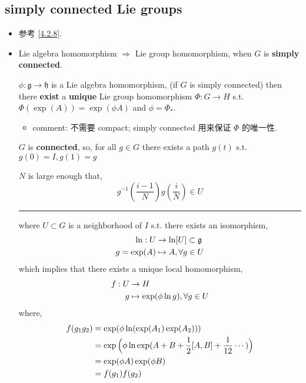\subsection{simply connected Lie groups} \label{subsection 5.1.1}
\begin{itemize}
	\item 参考 \eqref{4.2.8}.
	
	\item Lie algebra homomorphism $\Longrightarrow$ Lie group homomorphism, when $G$ is \textbf{simply connected}.
	
	$\phi : \mathfrak{g} \rightarrow \mathfrak{h}$ is a Lie algebra homomorphism, (if $G$ is simply connected) then there \textbf{exist} a \textbf{unique} Lie group homomorphism $\Phi : G \rightarrow H$ s.t. $\Phi(\exp(A)) = \exp(\phi A)$ and $\phi = \Phi_*$.
	\begin{itemize}
		\item comment: 不需要 compact; simply connected 用来保证 $\Phi$ 的唯一性.
	\end{itemize}
	
	\begin{tcolorbox}[title=proof:]
		$G$ is \textbf{connected}, so, for all $g \in G$ there exists a path $g(t)$ s.t. $g(0) = I, g(1) = g$
		
		$N$ is large enough that,
		\begin{equation}
			g^{- 1}(\frac{i - 1}{N}) g(\frac{i}{N}) \in U
		\end{equation}
		
		\noindent\rule[0.5ex]{\linewidth}{0.5pt} %
		
		where $U \subset G$ is a neighborhood of $I$ s.t. there exists an isomorphism,
		\begin{align}
			\ln : U & \rightarrow \ln[U] \subset \mathfrak{g} \notag \\
			g = \exp(A) & \mapsto A, \forall g \in U
		\end{align}
		which implies that there exists a unique local homomorphism,
		\begin{align}
			f : U & \rightarrow H \notag \\
			g & \mapsto \exp(\phi \ln g), \forall g \in U
		\end{align}
		where,
		\begin{align}
			f(g_1 g_2) &= \exp(\phi \ln(\exp(A_1) \exp(A_2))) \notag \\
			&= \exp \Big(\phi \ln \exp( A + B + \frac{1}{2} [A, B] + \frac{1}{12} \cdots) \Big) \notag \\
			&= \exp(\phi A) \exp(\phi B) \notag \\
			&= f(g_1) f(g_2)
		\end{align}
		

\end{tcolorbox}
\end{itemize}
